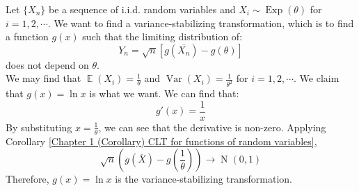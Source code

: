 \documentclass{huhtakm-template-book-v2}
\DeclareMathOperator{\E}{\mathbb{E}}
\DeclareMathOperator{\Var}{Var}
\DeclareMathOperator{\Exp}{Exp}
\DeclareMathOperator{\N}{N}
\begin{document}
\begin{eg}
	Let $\{X_{n}\}$ be a sequence of i.i.d. random variables and $X_{i}\sim\Exp(\theta)$ for $i=1,2,\cdots$. We want to find a variance-stabilizing transformation, which is to find a function $g(x)$ such that the limiting distribution of:
	\begin{equation*}
		Y_{n}=\sqrt{n}[g(\overline{X_{n}})-g(\theta)]
	\end{equation*}
	does not depend on $\theta$.\\
	We may find that $\E(X_{i})=\frac{1}{\theta}$ and $\Var(X_{i})=\frac{1}{\theta^{2}}$ for $i=1,2,\cdots$. We claim that $g(x)=\ln{x}$ is what we want. We can find that:
	\begin{equation*}
		g'(x)=\frac{1}{x}
	\end{equation*}
	By substituting $x=\frac{1}{\theta}$, we can see that the derivative is non-zero. Applying Corollary \ref{Chapter 1 (Corollary) CLT for functions of random variables},
	\begin{equation*}
		\sqrt{n}\left(g(\overline{X})-g\left(\frac{1}{\theta}\right)\right)\to\N(0,1)
	\end{equation*}
	Therefore, $g(x)=\ln{x}$ is the variance-stabilizing transformation.
\end{eg}
\end{document}
